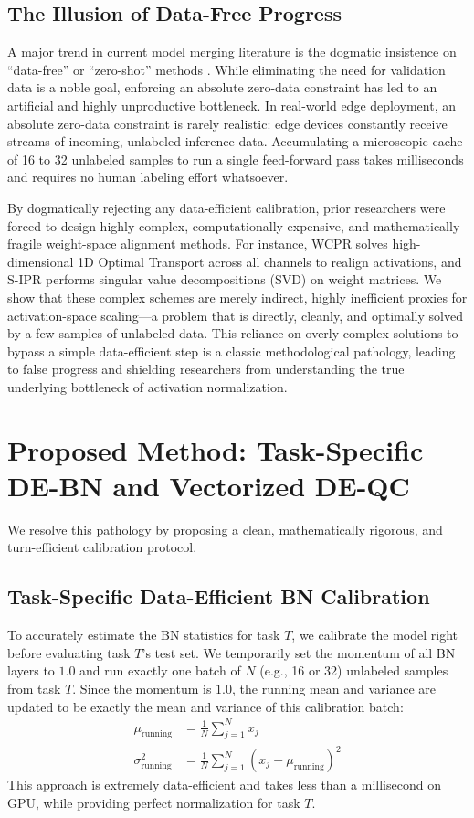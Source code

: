 \documentclass{article}
\theoremstyle{plain}
\theoremstyle{definition}
\theoremstyle{remark}
\begin{document}
\subsection{The Illusion of Data-Free Progress}
A major trend in current model merging literature is the dogmatic insistence on ``data-free'' or ``zero-shot'' methods \cite{paper5, paper9}. While eliminating the need for validation data is a noble goal, enforcing an absolute zero-data constraint has led to an artificial and highly unproductive bottleneck. In real-world edge deployment, an absolute zero-data constraint is rarely realistic: edge devices constantly receive streams of incoming, unlabeled inference data. Accumulating a microscopic cache of 16 to 32 unlabeled samples to run a single feed-forward pass takes milliseconds and requires no human labeling effort whatsoever.

By dogmatically rejecting any data-efficient calibration, prior researchers were forced to design highly complex, computationally expensive, and mathematically fragile weight-space alignment methods. For instance, WCPR \cite{paper9} solves high-dimensional 1D Optimal Transport across all channels to realign activations, and S-IPR \cite{paper5} performs singular value decompositions (SVD) on weight matrices. We show that these complex schemes are merely indirect, highly inefficient proxies for activation-space scaling—a problem that is directly, cleanly, and optimally solved by a few samples of unlabeled data. This reliance on overly complex solutions to bypass a simple data-efficient step is a classic methodological pathology, leading to false progress and shielding researchers from understanding the true underlying bottleneck of activation normalization.

\section{Proposed Method: Task-Specific DE-BN and Vectorized DE-QC}
\label{sec:method}

We resolve this pathology by proposing a clean, mathematically rigorous, and turn-efficient calibration protocol.

\subsection{Task-Specific Data-Efficient BN Calibration}
To accurately estimate the BN statistics for task $T$, we calibrate the model right before evaluating task $T$'s test set. 
We temporarily set the momentum of all BN layers to $1.0$ and run exactly one batch of $N$ (e.g., 16 or 32) unlabeled samples from task $T$. Since the momentum is $1.0$, the running mean and variance are updated to be exactly the mean and variance of this calibration batch:
\begin{align}
    \mu_{\text{running}} &= \frac{1}{N}\sum_{j=1}^N x_j \\
    \sigma^2_{\text{running}} &= \frac{1}{N}\sum_{j=1}^N (x_j - \mu_{\text{running}})^2
\end{align}
This approach is extremely data-efficient and takes less than a millisecond on GPU, while providing perfect normalization for task $T$.
\end{document}
